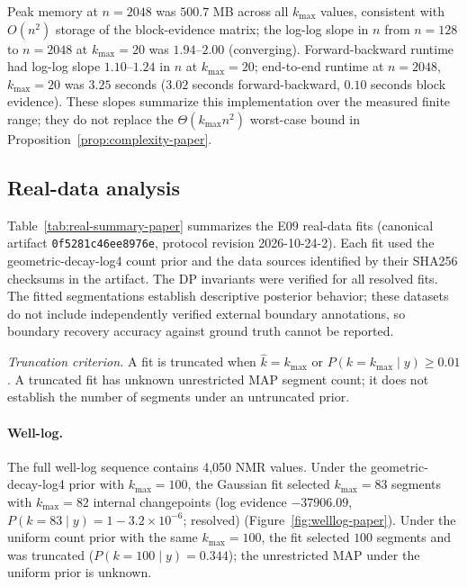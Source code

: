 Peak memory at $n=2048$ was $500.7$ MB across all $k_{\max}$ values, consistent with $O(n^2)$ storage of the block-evidence matrix; the log-log slope in $n$ from $n=128$ to $n=2048$ at $k_{\max}=20$ was $1.94$--$2.00$ (converging). Forward-backward runtime had log-log slope $1.10$--$1.24$ in $n$ at $k_{\max}=20$; end-to-end runtime at $n=2048$, $k_{\max}=20$ was $3.25$ seconds ($3.02$ seconds forward-backward, $0.10$ seconds block evidence). These slopes summarize this implementation over the measured finite range; they do not replace the $\Theta(k_{\max}n^2)$ worst-case bound in Proposition~\ref{prop:complexity-paper}.





\FloatBarrier
\subsection{Real-data analysis}
\label{sec:e09}
Table~\ref{tab:real-summary-paper} summarizes the E09 real-data fits (canonical artifact \texttt{0f5281c46ee8976e}, protocol revision 2026-10-24-2). Each fit used the geometric-decay-log4 count prior and the data sources identified by their SHA256 checksums in the artifact. The DP invariants were verified for all resolved fits. The fitted segmentations establish descriptive posterior behavior; these datasets do not include independently verified external boundary annotations, so boundary recovery accuracy against ground truth cannot be reported.

\textit{Truncation criterion.} A fit is truncated when $\hat k = k_{\max}$ or $P(k = k_{\max} \mid y) \geq 0.01$. A truncated fit has unknown unrestricted MAP segment count; it does not establish the number of segments under an untruncated prior.



\paragraph{Well-log.}
The full well-log sequence contains 4,050 NMR values. Under the geometric-decay-log4 prior with $k_{\max}=100$, the Gaussian fit selected $k_{\max}=83$ segments with $k_{\max}=82$ internal changepoints (log evidence $-37906.09$, $P(k=83 \mid y) = 1 - 3.2 \times 10^{-6}$; resolved) (Figure~\ref{fig:welllog-paper}). Under the uniform count prior with the same $k_{\max}=100$, the fit selected $100$ segments and was truncated ($P(k=100 \mid y) = 0.344$); the unrestricted MAP under the uniform prior is unknown.

